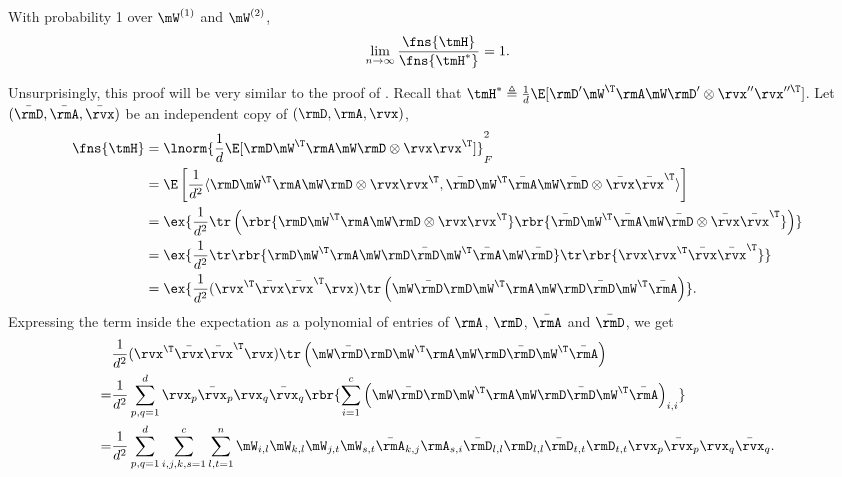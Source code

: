 \begin{proofof}{}
\begin{lemma}
\label{lemma:H-equivalence} With probability 1 over $\mW^{(1)}$ and $\mW^{(2)}$,
\[
\lim_{n\to\infty}\frac{\fns{\tmH}}{\fns{\tmH^*}}=1.
\]\end{lemma}
\begin{proofof}{}
Unsurprisingly, this proof will be very similar to the proof of .
Recall that $\tmH^*\triangleq\frac1d\E[\rmD'\mW^\T\rmA\mW\rmD'\otimes\rvx''\rvx''^\T]$. Let $(\bar{\rmD},\bar{\rmA},\bar{\rvx})$ be an independent copy of $(\rmD,\rmA,\rvx)$,
\begin{equation}
\begin{split}
    \fns{\tmH} &=\lnorm{\frac1d\E[\rmD\mW^\T\rmA\mW\rmD\otimes \rvx\rvx^\T]}_F^2\\
    &=\E\left[\frac{1}{d^2}\langle \rmD\mW^\T\rmA\mW\rmD\otimes \rvx\rvx^\T,\bar{\rmD}\mW^\T\bar{\rmA}\mW\bar{\rmD}\otimes \bar\rvx\bar\rvx^\T\rangle\right]\\
    &=\ex{\frac{1}{d^2}\tr\left(\rbr{\rmD\mW^\T\rmA\mW\rmD\otimes\rvx\rvx^\T}\rbr{\bar{\rmD}\mW^\T\bar{\rmA}\mW\bar{\rmD}\otimes\bar\rvx\bar\rvx^\T}\right)}\\
    &=\ex{\frac{1}{d^2}\tr\rbr{\rmD\mW^\T\rmA\mW\rmD\bar{\rmD}\mW^\T\bar{\rmA}\mW\bar{\rmD}}\tr\rbr{\rvx\rvx^\T\bar\rvx\bar\rvx^\T}}\\
    &=\ex{\frac{1}{d^2}(\rvx^\T\bar\rvx\bar\rvx^\T\rvx)\tr\left(\mW\bar{\rmD}\rmD\mW^\T\rmA\mW\rmD\bar{\rmD}\mW^\T\bar{\rmA}\right)}.
\end{split}
\end{equation}
Expressing the term inside the expectation as a polynomial of entries of $\rmA$, $\rmD$, $\bar{\rmA}$ and $\bar{\rmD}$, we get
\begin{equation}
\label{eqn:proof-Mfnorm-polyexpression}
\begin{split}
     &\frac{1}{d^2}(\rvx^\T\bar\rvx\bar\rvx^\T\rvx)\tr\left(\mW\bar{\rmD}\rmD\mW^\T\rmA\mW\rmD\bar{\rmD}\mW^\T\bar{\rmA}\right) \\
    =&\frac{1}{d^2}\sum_{p,q=1}^d\rvx_p\bar\rvx_p\rvx_q\bar\rvx_q\rbr{\sum_{i=1}^c\left(\mW\bar{\rmD}\rmD\mW^\T\rmA\mW\rmD\bar{\rmD}\mW^\T\bar{\rmA}\right)_{i,i}}\\
    =&\frac{1}{d^2}\sum_{p,q=1}^d\sum_{i,j,k,s=1}^c\sum_{l,t=1}^n \mW_{i,l}\mW_{k,l}\mW_{j,t}\mW_{s,t}\bar{\rmA}_{k,j}\rmA_{s,i}\bar{\rmD}_{l,l}\rmD_{l,l}\bar{\rmD}_{t,t}\rmD_{t,t}\rvx_p\bar\rvx_p\rvx_q\bar\rvx_q.
\end{split}
\end{equation}

\end{proofof}
\end{proofof}
